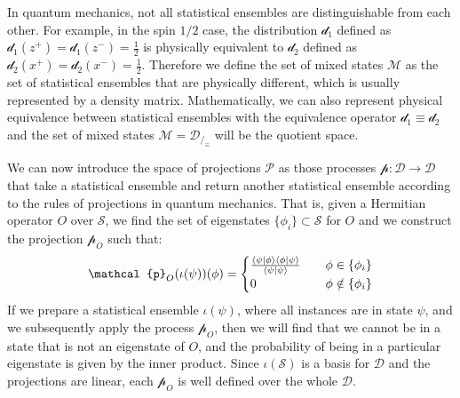 \documentclass[11pt]{article}
\begin{document}
In quantum mechanics, not all statistical ensembles are distinguishable from each other. For example, in the spin $1/2$ case, the distribution $\mathcal{d}_1$ defined as $\mathcal{d}_1(z^+)=\mathcal{d}_1(z^-)=\frac{1}{2}$ is physically equivalent to $\mathcal{d}_2$ defined as $\mathcal{d}_2(x^+)=\mathcal{d}_2(x^-)=\frac{1}{2}$. Therefore we define the set of mixed states $\mathcal{M}$ as the set of statistical ensembles that are physically different, which is usually represented by a density matrix. Mathematically, we can also represent physical equivalence between statistical ensembles with the equivalence operator $\mathcal{d}_1 \equiv \mathcal{d}_2$ and the set of mixed states $\mathcal{M} = \mathcal{D}_{/_\equiv}$ will be the quotient space.

We can now introduce the space of projections $\mathcal{P}$ as those processes $\mathcal{p} : \mathcal{D} \to \mathcal{D}$ that take a statistical ensemble and return another statistical ensemble according to the rules of projections in quantum mechanics. That is, given a Hermitian operator $O$ over $\mathcal{S}$, we find the set of eigenstates $\{\phi_i\} \subset \mathcal{S}$ for $O$ and we construct the projection $\mathcal{p}_O$ such that:
\begin{equation}\label{transition_probability}
\mathcal{p}_O(\iota(\psi))(\phi) = 
\begin{cases}
\frac{\braket{\psi | \phi} \braket{\phi|\psi}}{\braket{\psi|\psi}} &\quad\phi \in \{\phi_i\}\\
0 &\quad\phi \notin \{\phi_i\}\\
\end{cases}
\end{equation}
If we prepare a statistical ensemble $\iota(\psi)$, where all instances are in state $\psi$, and we subsequently apply the process $\mathcal{p}_O$, then we will find that we cannot be in a state that is not an eigenstate of $O$, and the probability of being in a particular eigenstate is given by the inner product. Since $\iota(\mathcal{S})$ is a basis for $\mathcal{D}$ and the projections are linear, each $\mathcal{p}_O$ is well defined over the whole $\mathcal{D}$.
\end{document}
